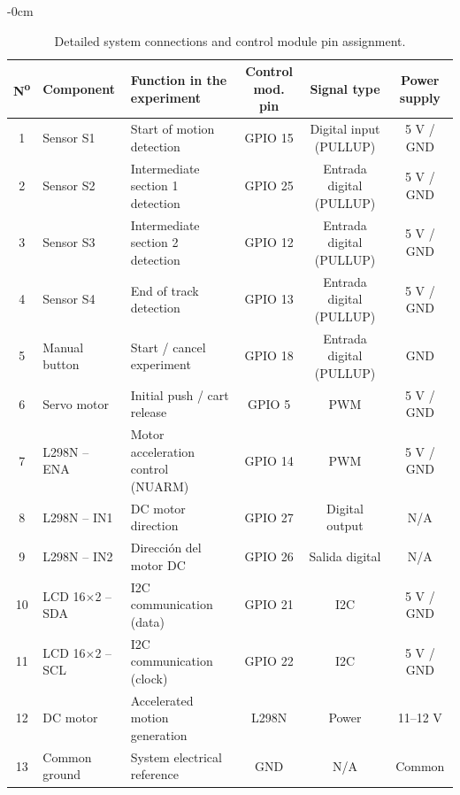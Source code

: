 \documentclass[sensors,article,submit,pdftex]{Definitions/mdpi}
\begin{document}
\begin{table}[H]
	\caption{Detailed system connections and control module pin assignment.\label{tab:connections}}
	\small
	\begin{adjustwidth}{-\extralength}{0cm}
		\renewcommand{\arraystretch}{1.3}
		\renewcommand{\tabularxcolumn}[1]{m{#1}}
		\begin{tabularx}{\fulllength}{clXccc}
			\toprule
			\textbf{N\textsuperscript{o}} & \textbf{Component} & \textbf{Function in the experiment} & \textbf{Control mod. pin} & \textbf{Signal type} & \textbf{Power supply} \\
			\midrule
			1  & Sensor S1      & Start of motion detection         & GPIO 15 & Digital input (PULLUP) & 5 V / GND    \\
			2  & Sensor S2      & Intermediate section 1 detection            & GPIO 25 & Entrada digital (PULLUP) & 5 V / GND    \\
			3  & Sensor S3      & Intermediate section 2 detection            & GPIO 12 & Entrada digital (PULLUP) & 5 V / GND    \\
			4  & Sensor S4      & End of track detection           & GPIO 13 & Entrada digital (PULLUP) & 5 V / GND    \\
			5  & Manual button  & Start / cancel experiment    & GPIO 18 & Entrada digital (PULLUP) & GND          \\
			6  & Servo motor    & Initial push / cart release & GPIO 5  & PWM                      & 5 V / GND    \\
			7  & L298N -- ENA   & Motor acceleration control (NUARM) & GPIO 14 & PWM                      & 5 V / GND    \\
			8  & L298N -- IN1   & DC motor direction                  & GPIO 27 & Digital output           & N/A          \\
			9  & L298N -- IN2   & Direcci\'on del motor DC                  & GPIO 26 & Salida digital           & N/A          \\
			10 & LCD 16$\times$2 -- SDA & I2C communication (data)       & GPIO 21 & I2C                      & 5 V / GND    \\
			11 & LCD 16$\times$2 -- SCL & I2C communication (clock)       & GPIO 22 & I2C                      & 5 V / GND    \\
			12 & DC motor       & Accelerated motion generation     & L298N   & Power                 & 11--12 V     \\
			13 & Common ground  & System electrical reference        & GND     & N/A                      & Common       \\
			\bottomrule
		\end{tabularx}
	\end{adjustwidth}
\end{table}
\end{document}
